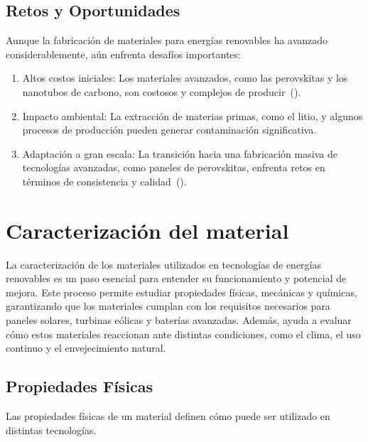 \documentclass[letterpaper, 12pt]{article}
\begin{document}
\subsection{Retos y Oportunidades}

Aunque la fabricación de materiales para energías renovables ha avanzado
considerablemente, aún enfrenta desafíos importantes:

\begin{enumerate}
      \item Altos costos iniciales: Los materiales avanzados, como las perovskitas y los
            nanotubos de carbono, son costosos y complejos de
            producir~(\cite{Leader_Gaustad2019a}).

      \item Impacto ambiental: La extracción de materias primas, como el litio, y algunos
            procesos de producción pueden generar contaminación significativa.

      \item Adaptación a gran escala: La transición hacia una fabricación masiva de
            tecnologías avanzadas, como paneles de perovskitas, enfrenta retos en términos
            de consistencia y calidad~(\cite{Howaniec2022}).
\end{enumerate}

\section{Caracterización del material}

La caracterización de los materiales utilizados en tecnologías de energías
renovables es un paso esencial para entender su funcionamiento y potencial de
mejora. Este proceso permite estudiar propiedades físicas, mecánicas y
químicas, garantizando que los materiales cumplan con los requisitos necesarios
para paneles solares, turbinas eólicas y baterías avanzadas. Además, ayuda a
evaluar cómo estos materiales reaccionan ante distintas condiciones, como el
clima, el uso continuo y el envejecimiento natural.

\subsection{Propiedades Físicas}

Las propiedades físicas de un material definen cómo puede ser utilizado en
distintas tecnologías.
\end{document}
